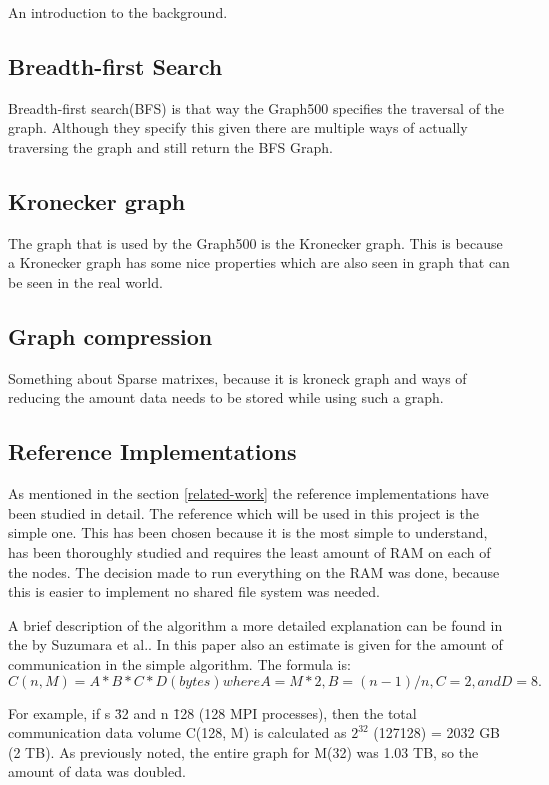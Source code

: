 An introduction to the background.

\subsection{Breadth-first Search}
Breadth-first search(BFS) is that way the Graph500 specifies the traversal of the graph. Although they specify this given there are multiple ways of actually traversing the graph and still return the BFS Graph.


\subsection{Kronecker graph}
The graph that is used by the Graph500 is the Kronecker graph\cite{leskovec2010kronecker}. This is because a Kronecker graph has some nice properties which are also seen in graph that can be seen in the real world.

\subsection{Graph compression}
Something about Sparse matrixes, because it is kroneck graph and ways of reducing the amount data needs to be stored while using such a graph.

\subsection{Reference Implementations}
As mentioned in the section \ref{related-work} the reference implementations have been studied in detail. The reference which will be used in this project is the 
simple one. This has been chosen because it is the most simple to understand, has been thoroughly studied and requires the least amount of RAM on each of the nodes. The decision made to run everything on the RAM was done, because this is easier to implement no shared file system was needed. 

A brief description of the algorithm a more detailed explanation can be found in the by Suzumara et al.\cite{suzumura2011performance}.
In this paper also an estimate is given for the amount of communication in the simple algorithm. The formula is:\\
\begin{math}
C(n, M) = A * B * C * D (bytes)  where A = M*2, B = (n-1)/n, C=2, and D=8.  
\end{math}

For example, if s \= 32 and n \= 128 (128 MPI processes), then the total communication 
data volume C(128, M) is calculated as $2^{32}$   \* (127\/128)   = 2032 GB (2 TB). As previously noted, the entire graph for M(32) was 
1.03 TB, so the amount of data was doubled.  

